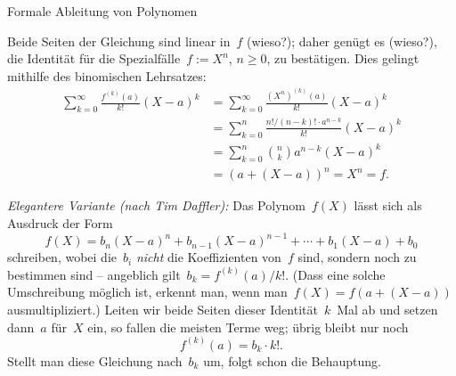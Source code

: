 \documentclass{algblatt}
\begin{document}
\begin{aufgabe}{Formale Ableitung von Polynomen}
\begin{loesungE}
\item Beide Seiten der Gleichung sind linear in~$f$ (wieso?); daher genügt es
(wieso?), die Identität für die Spezialfälle~$f := X^n$, $n \geq 0$, zu
bestätigen. Dies gelingt mithilfe des binomischen Lehrsatzes:
\begin{align*}
  \sum_{k=0}^\infty \frac{f^{(k)}(a)}{k!} (X-a)^k &=
  \sum_{k=0}^\infty \frac{(X^n)^{(k)}(a)}{k!} (X-a)^k \\
  &= \sum_{k=0}^n \frac{n! / (n-k)! \cdot a^{n-k}}{k!} (X-a)^k \\
  &= \sum_{k=0}^n \binom{n}{k} a^{n-k} (X-a)^k \\
  &= (a + (X-a))^n = X^n = f.
\end{align*}

\emph{Elegantere Variante (nach Tim Daffler):} Das Polynom~$f(X)$ lässt sich
als Ausdruck der Form
\[ f(X) = b_n (X-a)^n + b_{n-1} (X-a)^{n-1} + \cdots + b_1 (X-a) + b_0 \]
schreiben, wobei die~$b_i$ \emph{nicht} die Koeffizienten von~$f$ sind,
sondern noch zu bestimmen sind -- angeblich gilt~$b_k = f^{(k)}(a) / k!$. (Dass
eine solche Umschreibung möglich ist, erkennt man, wenn man~$f(X) = f(a+(X-a))$
ausmultipliziert.) Leiten wir beide Seiten dieser Identität~$k$~Mal ab und
setzen dann~$a$ für~$X$ ein, so fallen die meisten Terme weg; übrig bleibt nur noch
\[ f^{(k)}(a) = b_k \cdot k!. \]
Stellt man diese Gleichung nach~$b_k$ um, folgt schon die Behauptung.
\end{loesungE}
\end{aufgabe}
\end{document}
